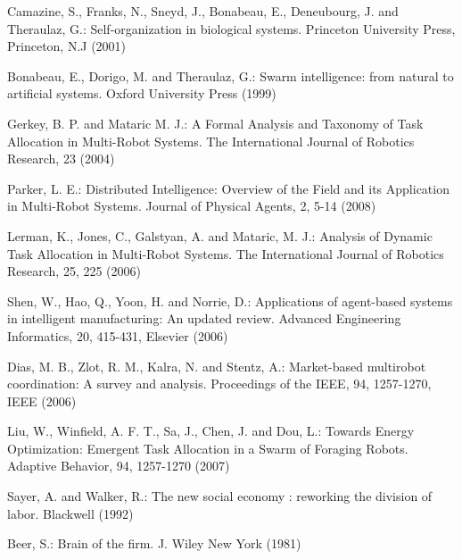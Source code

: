 \documentclass{llncs}
\begin{document}
\begin{thebibliography}{}
Camazine, S., Franks, N., Sneyd, J., Bonabeau, E., Deneubourg, J. and Theraulaz, G.: Self-organization in biological systems.
Princeton University Press, Princeton, N.J (2001)

Bonabeau, E., Dorigo, M. and Theraulaz, G.:
Swarm intelligence: from natural to artificial systems.
Oxford University Press (1999)

Gerkey, B. P. and Mataric M. J.:
A Formal Analysis and Taxonomy of Task Allocation in Multi-Robot Systems.
The International Journal of Robotics Research, 23  (2004)

Parker, L. E.:
Distributed Intelligence: Overview of the Field and its Application in Multi-Robot Systems.
Journal of Physical Agents,  2, 5-14 (2008)

Lerman, K., Jones, C., Galstyan, A. and Mataric, M. J.:
Analysis of Dynamic Task Allocation in Multi-Robot Systems. 
The International Journal of Robotics Research, 25, 225  (2006)

Shen, W., Hao, Q., Yoon, H. and Norrie, D.:
Applications of agent-based systems in intelligent manufacturing: An updated review. Advanced Engineering Informatics, 20, 415-431, Elsevier (2006)

Dias, M. B., Zlot, R. M., Kalra, N. and Stentz, A.:
Market-based multirobot coordination: A survey and analysis. 
Proceedings of the IEEE, 94, 1257-1270,  IEEE  (2006)

Liu, W., Winfield, A. F. T., Sa, J., Chen, J. and Dou, L.:
Towards Energy Optimization: Emergent Task Allocation in a Swarm of Foraging Robots. Adaptive Behavior, 94, 1257-1270 (2007)

Sayer, A. and Walker, R.: 
The new social economy : reworking the division of labor.
Blackwell (1992)

Beer, S.: 
Brain of the firm.
J. Wiley New York (1981)


\end{thebibliography}
\end{document}
